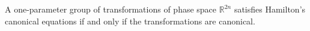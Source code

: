 A one-parameter group of transformations of phase space $\mathbb{R}^{2n}$ satisfies Hamilton's canonical equations if and only if the transformations are canonical.
